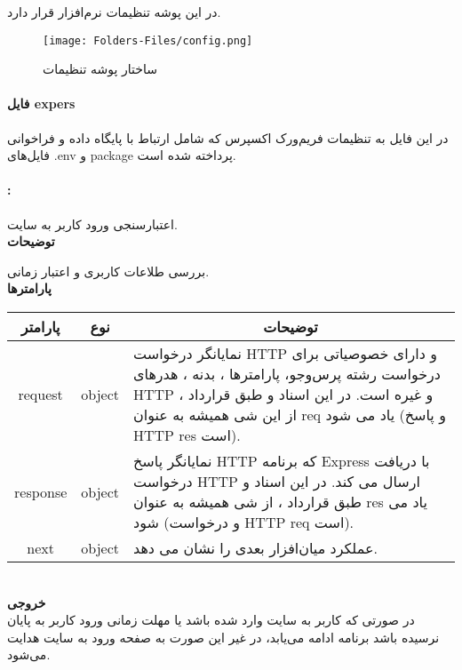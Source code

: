 در این پوشه تنظیمات نرم‌افزار قرار دارد. 

\begin{figure}[H]
	\texttt{[image: Folders-Files/config.png]}
	\centering
	\caption{ساختار پوشه تنظیمات}
	\label{fig:folder-config}
\end{figure}

\paragraph{فایل expers}
در این فایل به تنظیمات فریم‌ورک اکسپرس که شامل ارتباط با پایگاه داده و فراخوانی فایل‌های .env و package پرداخته شده است. 

\paragraph{:}
اعتبارسنجی ورود کاربر به سایت.
\\
\textbf{توضیحات}
\hr
\begin{flushleft}
	\framebox[.9\textwidth][l]{
		\lr{
			\textcolor{type}{void}
			\textcolor{func}{logInChecker}
			\textcolor{symb}{(}
			\textcolor{type}{object}
			\textcolor{arg}{request}
			\textcolor{symb}{,}
			\textcolor{type}{object}
			\textcolor{arg}{response}
			\textcolor{symb}{,}
			\textcolor{type}{object}
			\textcolor{arg}{next}
			\textcolor{symb}{);}
		}
	}
\end{flushleft}
بررسی طلاعات کاربری و اعتبار زمانی.
\\
\textbf{پارامترها}
\hr \\[10pt]
\begin{tabular}{|m{4cm}|m{3cm}|m{10cm}|}
	\hline
	\multicolumn{1}{|c}{پارامتر}
	&
	\multicolumn{1}{|c}{نوع}
	&
	\multicolumn{1}{|c|}{توضیحات}
	\\
	\hline
	\multicolumn{1}{|c}{request}
	&
	\multicolumn{1}{|c|}{object}
	&
	نمایانگر درخواست HTTP و دارای خصوصیاتی برای درخواست رشته پرس‌و‌جو، پارامترها ، بدنه ، هدرهای HTTP و غیره است.
	در این اسناد و طبق قرارداد ، از این شی همیشه به عنوان req یاد می شود (و پاسخ HTTP res است).
	\\
	\hline
	\multicolumn{1}{|c}{response}
	&
	\multicolumn{1}{|c|}{object}
	&
	نمایانگر پاسخ HTTP که برنامه Express با دریافت درخواست HTTP ارسال می کند.
	در این اسناد و طبق قرارداد ، از شی همیشه به عنوان res یاد می شود (و درخواست HTTP req است).
	\\
	\hline
	\multicolumn{1}{|c}{next}
	&
	\multicolumn{1}{|c|}{object}
	&
	عملکرد میان‌افزار بعدی را نشان می دهد.
	\\
	\hline
\end{tabular}
\\[10pt]
\textbf{خروجی}
\hr \\
در صورتی که کاربر به سایت وارد شده باشد یا مهلت زمانی ورود کاربر به پایان نرسیده باشد برنامه ادامه می‌یابد، در غیر این صورت به صفحه ورود به سایت هدایت می‌شود.

